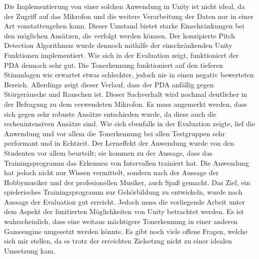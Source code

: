 Die Implementierung von einer solchen Anwendung in Unity ist nicht ideal, da der Zugriff auf das Mikrofon und die weitere Verarbeitung der Daten nur in einer Art vonstattengehen kann. Dieser Umstand bietet starke Einschränkungen bei den möglichen Ansätzen, die verfolgt werden können. Der konzipierte Pitch Detection Algorithmus wurde dennoch mithilfe der einschränkenden Unity Funktionen implementiert. Wie sich in der Evaluation zeigt, funktioniert der PDA dennoch sehr gut. Die Tonerkennung funktioniert auf den tieferen Stimmlagen wie erwartet etwas schlechter, jedoch nie in einen negativ bewerteten Bereich. Allerdings zeigt dieser Verlauf, dass der PDA anfällig gegen Störgeräusche und Rauschen ist. Dieser Sachverhalt wird nochmal deutlicher in der Befragung zu dem verwendeten Mikrofon. Es muss angemerkt werden, dass sich gegen sehr robuste Ansätze entschieden wurde, da diese auch die rechenintensiven Ansätze sind. Wie sich ebenfalls in der Evaluation zeigte, lief die Anwendung und vor allem die Tonerkennung bei allen Testgruppen sehr performant und in Echtzeit. Der Lerneffekt der Anwendung wurde von den Studenten vor allem beurteilt; sie kommen zu der Aussage, dass das Trainingsprogramm das Erkennen von Intervallen trainiert hat. Die Anwendung hat jedoch nicht nur Wissen vermittelt, sondern nach der Aussage der Hobbymusiker und der profesionellen Musiker, auch Spaß gemacht. Das Ziel, ein spielerisches Trainingsprogramm zur Gehörbildung zu entwickeln, wurde nach Aussage der Evaluation gut erreicht. Jedoch muss die vorliegende Arbeit unter dem Aspekt der limitierten Möglichkeiten von Unity betrachtet werden. Es ist wahrscheinlich, dass eine weitaus mächtigere Tonerkennung in einer anderen Gameengine umgesetzt werden könnte. 
Es gibt noch viele offene Fragen, welche sich mir stellen, da es trotz der erreichten Zielsetzng nicht zu einer idealen Umsetzung kam. \\\\
